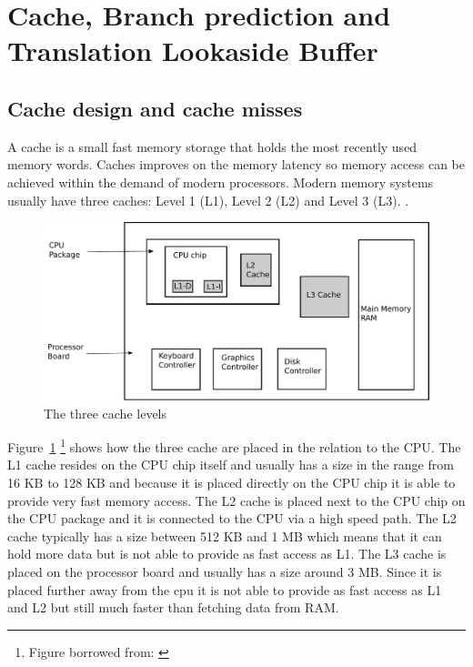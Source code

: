 \section{Cache, Branch prediction and Translation Lookaside Buffer}

\subsection{Cache design and cache misses}

A cache is a small fast memory storage that holds the most recently used memory words.
Caches improves on the memory latency so memory access can be achieved within the demand of modern processors.
Modern memory systems usually have three caches: Level 1 (L1), Level 2 (L2) and Level 3 (L3). \citep[Section~4.5.1]{Tanenbaum}.

\begin{figure}
\includegraphics[width=\textwidth]{CacheLevels.pdf}
\caption{The three cache levels}
\label{fig:CacheLevels}
\end{figure}

Figure~\ref{fig:CacheLevels} \footnote{Figure borrowed from: \citep[Section~4.5.1]{Tanenbaum}} shows how the three cache are placed in the relation to the CPU. 
The L1 cache resides on the CPU chip itself and usually has a size in the range from 16 KB to 128 KB and because it is placed directly on the CPU chip it is able to provide very fast memory access.
The L2 cache is placed next to the CPU chip on the CPU package and it is connected to the CPU via a high speed path. The L2 cache typically has a size between 512 KB and 1 MB which means that it can hold more data but is not able to provide as fast access as L1.
The L3 cache is placed on the processor board and usually has a size around 3 MB. 
Since it is placed further away from the cpu it is not able to provide as fast access as L1 and L2 but still much faster than fetching data from RAM.

